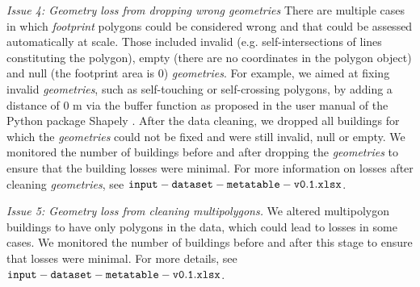 \documentclass[fleqn,10pt]{wlscirep}
\begin{document}
\medskip \noindent \textit{Issue 4: Geometry loss from dropping wrong geometries} \hspace{0.1cm} 
There are multiple cases in which \textit{footprint} polygons could be considered wrong and that could be assessed automatically at scale. Those included invalid (e.g. self-intersections of lines constituting the polygon), empty (there are no coordinates in the polygon object) and null (the footprint area is 0) \textit{geometries}. 
For example, we aimed at fixing invalid \textit{geometries}, such as self-touching or self-crossing polygons, by adding a distance of 0 m via the buffer function as proposed in the user manual of the Python package Shapely \cite{gillies_2021}. After the data cleaning, we dropped all buildings for which the \textit{geometries} could not be fixed and were still invalid, null or empty. We monitored the number of buildings before and after dropping the \textit{geometries} to ensure that the building losses were minimal. For more information on losses after cleaning \textit{geometries}, see ${\tt input-dataset-metatable-v0.1.xlsx}$.

\medskip \noindent \textit{Issue 5: Geometry loss from cleaning multipolygons.} \hspace{0.1cm} We altered multipolygon buildings to have only polygons in the data, which could lead to losses in some cases. We monitored the number of buildings before and after this stage to ensure that losses were minimal. For more details, see ${\tt input-dataset-metatable-v0.1.xlsx}$.
\end{document}
